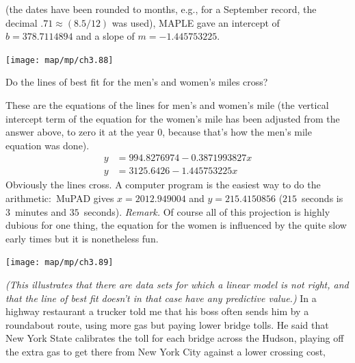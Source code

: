 \begin{exercises}
\begin{answer}
     (the dates have been rounded to months, e.g., for a September record,
     the decimal $.71\approx (8.5/12)$ was used),
     MAPLE gave an intercept of $b=378.7114894$ and a slope of 
    $m=-1.445753225$.
    \begin{center}  \small
      \texttt{[image: map/mp/ch3.88]}
    \end{center}
   \end{answer}   
  \item 
  Do the lines of best fit for the men's and women's miles cross?
  \begin{answer}
    These are the equations of the lines for men's and women's mile 
    (the vertical intercept term of the equation
    for the women's mile has been adjusted from the answer above,
    to zero it at the year $0$,
    because that's how the men's mile equation was done).
    \begin{align*}
        y &=994.8276974-0.3871993827x  \\
        y &=3125.6426-1.445753225x
    \end{align*}
    Obviously the lines cross.
    A computer program  is the easiest way to do the
    arithmetic:~MuPAD gives $x=2012.949004$ and $y=215.4150856$
    ($215$~seconds is $3$~minutes and $35$~seconds).
    \textit{Remark.}
    Of course all of this projection is highly dubious \Dash  for one thing,
    the equation for the women is influenced by the quite slow early 
    times \Dash  but it is nonetheless fun.
     \begin{center}  \small
       \texttt{[image: map/mp/ch3.89]}
     \end{center}
  \end{answer}
  \item
    \textit{(This illustrates that there are data sets for which a 
    linear model is not right,  and that the line of best fit doesn't
    in that case have any predictive value.)} 
    In a highway restaurant a trucker told me that his boss often sends 
    him by a roundabout route, using more gas
    but paying lower bridge tolls.
    He said that New York State calibrates the 
    toll for each bridge across the Hudson, 
    playing off the extra gas to get there
    from New York City against a lower crossing cost,

\end{exercises}
